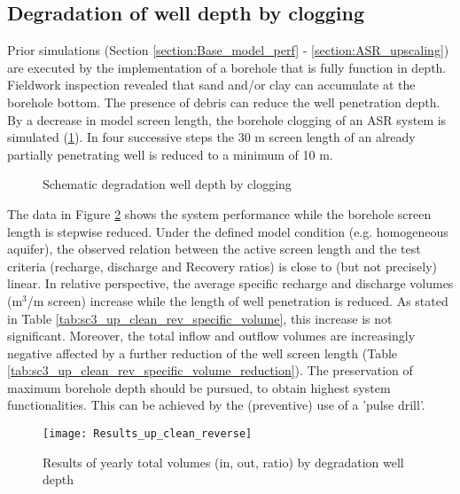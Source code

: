\subsection{Degradation of well depth by clogging}
\label{subsec:Sens_well_depth}
Prior simulations (Section \ref{section:Base_model_perf} - \ref{section:ASR_upscaling}) are executed by the implementation of a borehole that is fully function in depth. Fieldwork inspection revealed that sand and/or clay can accumulate at the borehole bottom. The presence of debris can reduce the well penetration depth. By a decrease in model screen length, the borehole clogging of an ASR system is simulated (\ref{fig:Schematic_up_clean_reverse}). In four successive steps the 30 m screen length of an already partially penetrating well is reduced to a minimum of 10 m. 

\begin{figure}[H]
\centering
{}
\captionsetup{justification=centering}
\caption{Schematic degradation well depth by clogging}
\label{fig:Schematic_up_clean_reverse}
\end{figure}

The data in Figure \ref{fig:Results_up_clean_reverse} shows the system performance while the borehole screen length is stepwise reduced. Under the defined model condition (e.g. homogeneous aquifer), the observed relation between the active screen length and the test criteria (recharge, discharge and Recovery ratios) is close to (but not precisely) linear. In relative perspective, the average specific recharge and discharge volumes (m$^3$/m screen) increase while the length of well penetration is reduced. As stated in Table \ref{tab:sc3_up_clean_rev_specific_volume}, this increase is not significant. Moreover, the total inflow and outflow volumes are increasingly negative affected by a further reduction of the well screen length (Table \ref{tab:sc3_up_clean_rev_specific_volume_reduction}). The preservation of maximum borehole depth should be pursued, to obtain highest system functionalities. This can be achieved by the (preventive) use of a 'pulse drill'. 

\begin{figure}[H]
 \centering
 \texttt{[image: Results\_up\_clean\_reverse]}
 \captionsetup{justification=centering} 
 \caption{Results of yearly total volumes (in, out, ratio) by degradation well depth}
 \label{fig:Results_up_clean_reverse}
\end{figure}

